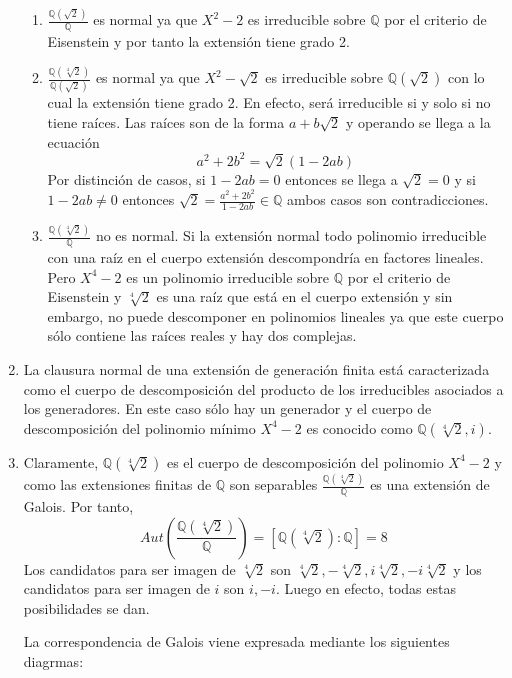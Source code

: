 \begin{enumerate}
\begin{enumerate}
\item $\frac{\mathbb{Q}(\sqrt{2})}{\mathbb{Q}}$ es normal ya que $X^2-2$ es irreducible sobre $\mathbb{Q}$ por el criterio de Eisenstein y por tanto la extensión tiene grado 2. 
\item $\frac{\mathbb{Q}(\sqrt[4]{2})}{\mathbb{Q}(\sqrt{2})}$ es normal ya que $X^2-\sqrt{2}$ es irreducible sobre $\mathbb{Q}(\sqrt{2})$ con lo cual la extensión tiene grado 2. En efecto, será irreducible si y solo si no tiene raíces. Las raíces son de la forma $a+b\sqrt{2}$ y operando se llega a la ecuación $$a^2+2b^2 = \sqrt{2}(1-2ab)$$ Por distinción de casos, si $1-2ab = 0$ entonces se llega a $\sqrt{2}  = 0$ y si $1-2ab \neq 0$ entonces $\sqrt{2} = \frac{a^2+2b^2}{1-2ab} \in \mathbb{Q}$ ambos casos son contradicciones. 
\item $\frac{\mathbb{Q}(\sqrt[4]{2})}{\mathbb{Q}}$ no es normal. Si la extensión normal todo polinomio irreducible con una raíz en el cuerpo extensión descompondría en factores lineales. Pero $X^4 - 2$ es un polinomio irreducible sobre $\mathbb{Q}$ por el criterio de Eisenstein y $\sqrt[4]{2}$ es una raíz que está en el cuerpo extensión y sin embargo, no puede descomponer en polinomios lineales ya que este cuerpo sólo contiene las raíces reales y hay dos complejas. 
\end{enumerate}

\item La clausura normal de una extensión de generación finita está caracterizada como el cuerpo de descomposición del producto de los irreducibles asociados a los generadores. En este caso sólo hay un generador y el cuerpo de descomposición del polinomio mínimo $X^4-2$ es conocido como $\mathbb{Q}(\sqrt[4]{2},i)$.

\item Claramente, $\mathbb{Q}(\sqrt[4]{2})$ es el cuerpo de descomposición del polinomio $X^4 - 2$ y como las extensiones finitas de $\mathbb{Q}$ son separables $\frac{\mathbb{Q}(\sqrt[4]{2})}{\mathbb{Q}}$ es una extensión de Galois. Por tanto, $$Aut(\frac{\mathbb{Q}(\sqrt[4]{2})}{\mathbb{Q}}) = [\mathbb{Q}(\sqrt[4]{2}):\mathbb{Q}] = 8$$ Los candidatos para ser imagen de $\sqrt[4]{2}$ son $\sqrt[4]{2},-\sqrt[4]{2},i\sqrt[4]{2},-i\sqrt[4]{2}$ y los candidatos para ser imagen de $i$ son $i,-i$. Luego en efecto, todas estas posibilidades se dan. 

La correspondencia de Galois viene expresada mediante los siguientes diagrmas:


\end{enumerate}
